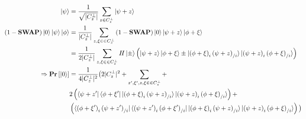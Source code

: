\documentclass[manuscript,screen,review]{acmart}
\begin{document}
\begin{equation*}
  \begin{split}
    \ket{\psi} & = \frac{1}{\sqrt{|C_{z}^{\perp}|}}\sum_{z \in C_{z}^{\perp}}{ \ket{\psi + z   }} \\ 
    (1-\mathbf{SWAP})\ket{0}\ket{\psi}\ket{\phi} &= \frac{1}{|C_{z}^{\perp}|}\sum_{z,\xi \in  \in C_{z}^{\perp} }{(1-\mathbf{SWAP})\ket{0} \ket{\psi + z   }\ket{\phi + \xi   }}\\
    & = \frac{1}{2|C_{z}^{\perp}|}\sum_{z,\xi \in  \in C_{z}^{\perp} }{  H\ket{\pm} \left( \ket{\psi + z   }\ket{\phi + \xi   }  \pm  \ket{  \left( \phi + \xi \right)_{ i }\left( \psi + z \right)_{ / i }   }\ket{\left( \psi + z \right)_{ i }\left( \phi + \xi \right)_{ / i }  }  \right) }\\
    \Rightarrow \mathbf{Pr} \left[ { \ket{0} } \right] &=  \frac{1}{4|C_{z}^{\perp}|^{2}} \big(  2 |C_{z}^{\perp}|^{2} + \sum_{z^{\prime},\xi^{\prime},  z,\xi \in  \in C_{z}^{\perp} }  + \\
      & 2\left( \bra{\psi + z^{\prime}   }\bra{\phi + \xi^{\prime}   } \ket{  \left( \phi + \xi \right)_{ i }\left( \psi + z \right)_{ / i }   }\ket{\left( \psi + z \right)_{ i }\left( \phi + \xi \right)_{ / i }  }  \right) + \\
    & \left( \bra{  \left( \phi + \xi^{\prime} \right)_{ i }\left( \psi + z^{\prime} \right)_{ / i }   }\bra{\left( \psi + z^{\prime} \right)_{ i }\left( \phi + \xi^{\prime} \right)_{ / i }  }  \ket{  \left( \phi + \xi \right)_{ i }\left( \psi + z \right)_{ / i }   }\ket{\left( \psi + z \right)_{ i }\left( \phi + \xi \right)_{ / i }  } \right) \big)
  \end{split}
\end{equation*}


\printbibliography
\end{document}
